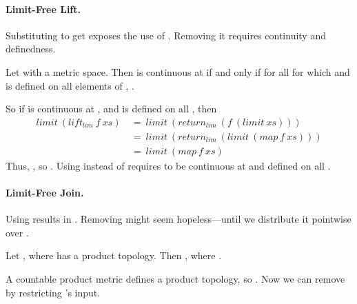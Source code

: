 \paragraph{Limit-Free Lift.}
Substituting to get  exposes the use of . Removing it requires continuity and definedness.

\begin{lemma}
\label{lem:continuity}
Let  with  a metric space. Then  is continuous at  if and only if for all  for which  and  is defined on all elements of ,
.
\end{lemma}

So if  is continuous at , and  is defined on all , then
\begin{equation}
\begin{aligned}
  limit~(lift_{lim}~f~xs)
    &\ =\  limit~(return_{lim}~(f~(limit~xs))) \\
    &\ =\  limit~(return_{lim}~(limit~(map~f~xs))) \\
    &\ =\  limit~(map~f~xs)
\end{aligned}
\end{equation}
Thus, , so . Using  instead of  requires  to be continuous at  and defined on all .

\paragraph{Limit-Free Join.}
Using  results in .
Removing  might seem hopeless---until we distribute it pointwise over .

\begin{lemma}
Let , where  has a product topology. Then , where .
\end{lemma}

A countable product metric defines a product topology, so  . Now we can remove  by restricting 's input.

